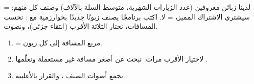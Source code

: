 \begin{statement}
لدينا  زبائن معروفين (عدد الزيارات الشهرية، متوسط السلة بالآلاف) وصنف كل منهم:  = سيشتري الاشتراك المميز،  = لا. اكتب برنامجًا يصنف زبونًا جديدًا بخوارزمية \textbf{} مع : نحسب المسافات، نختار الثلاثة الأقرب (انتقاء جزئي)، ونصوت.
\end{statement}
\begin{stepsbox}\begin{enumerate}
\item {} = مربع المسافة إلى كل زبون.
\item لاختيار الأقرب  مرات: نبحث عن أصغر مسافة غير مستعملة ونعلّمها .
\item نجمع أصوات الصنف ، والقرار بالأغلبية.
\end{enumerate}\end{stepsbox}

